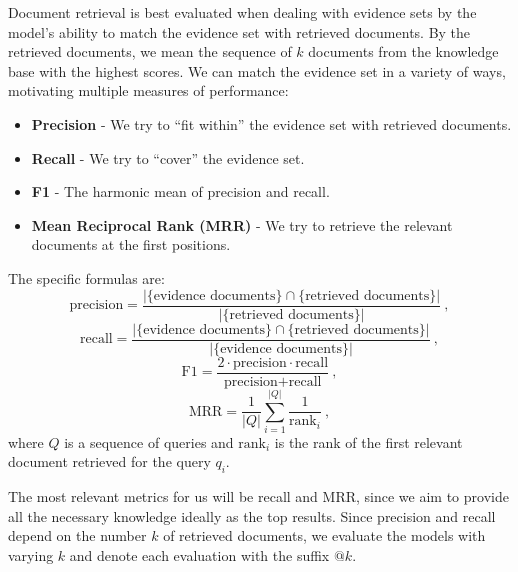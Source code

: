 Document retrieval is best evaluated when dealing with evidence sets by the model's ability to match the evidence set with retrieved documents.
By the retrieved documents, we mean the sequence of $k$ documents from the knowledge base with the highest scores.
We can match the evidence set in a variety of ways, motivating multiple measures of performance:
\begin{itemize}
    \item \textbf{Precision} - We try to ``fit within'' the evidence set with retrieved documents.
    \item \textbf{Recall} - We try to ``cover'' the evidence set.
    \item \textbf{F1} - The harmonic mean of precision and recall. 
    \item \textbf{Mean Reciprocal Rank (MRR)} \citep{mrr} - We try to retrieve the relevant documents at the first positions. 
\end{itemize}
The specific formulas are: 
\begin{equation}
    \text{precision} = \frac{|\{\text{evidence documents}\}\cap\{\text{retrieved documents}\}|}{|\{\text{retrieved documents}\}|}\ ,
\end{equation}
\begin{equation}
    \text{recall} = \frac{|\{\text{evidence documents}\}\cap\{\text{retrieved documents}\}|}{|\{\text{evidence documents}\}|}\ ,
\end{equation}
\begin{equation}
    \text{F1} = 
    \frac{2\cdot\text{precision}\cdot\text{recall}}{\text{precision}+\text{recall}}\ ,
\end{equation}
\begin{equation}
    \text{MRR} = \frac{1}{|Q|}\sum_{i=1}^{|Q|}{\frac{1}{\text{rank}_i}}\ ,
\end{equation}
where $Q$ is a sequence of queries and $\text{rank}_i$ is the rank of the first relevant document retrieved for the query $q_i$.

The most relevant metrics for us will be recall and MRR, since we aim to provide all the necessary knowledge ideally as the top results. 
Since precision and recall depend on the number $k$ of retrieved documents, we evaluate the models with varying $k$ and denote each evaluation with the suffix $\text{@}k$.